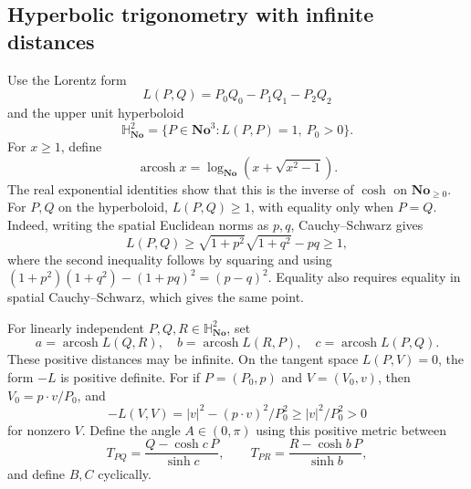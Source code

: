 \documentclass[11pt,letterpaper]{article}
\theoremstyle{definition}
\theoremstyle{remark}
\newcommand{\No}{\mathbf{No}}
\newcommand{\arcosh}{\operatorname{arcosh}}
\numberwithin{equation}{section}
\begin{document}
\subsection{Hyperbolic trigonometry with infinite distances}
Use the Lorentz form
\[
 L(P,Q)=P_0Q_0-P_1Q_1-P_2Q_2
\]
and the upper unit hyperboloid
\[
 \mathbb H^2_{\No}=\{P\in\No^3:L(P,P)=1,\ P_0>0\}.
\]
For $x\ge1$, define
\[
 \arcosh x=\log_{\No}(x+\sqrt{x^2-1}).
\]
The real exponential identities show that this is the inverse of $\cosh$ on $\No_{\ge0}$. For $P,Q$ on the hyperboloid, $L(P,Q)\ge1$, with equality only when $P=Q$. Indeed, writing the spatial Euclidean norms as $p,q$, Cauchy--Schwarz gives
\[
 L(P,Q)\ge\sqrt{1+p^2}\sqrt{1+q^2}-pq\ge1,
\]
where the second inequality follows by squaring and using
$(1+p^2)(1+q^2)-(1+pq)^2=(p-q)^2$. Equality also requires equality in spatial Cauchy--Schwarz, which gives the same point.

For linearly independent $P,Q,R\in\mathbb H^2_{\No}$, set
\[
 a=\arcosh L(Q,R),\quad b=\arcosh L(R,P),\quad c=\arcosh L(P,Q).
\]
These positive distances may be infinite. On the tangent space $L(P,V)=0$, the form $-L$ is positive definite. For if $P=(P_0,p)$ and $V=(V_0,v)$, then $V_0=p\cdot v/P_0$, and
\[
 -L(V,V)=|v|^2-(p\cdot v)^2/P_0^2\ge|v|^2/P_0^2>0
\]
for nonzero $V$. Define the angle $A\in(0,\pi)$ using this positive metric between
\[
 T_{PQ}=\frac{Q-\cosh c\,P}{\sinh c},\qquad
 T_{PR}=\frac{R-\cosh b\,P}{\sinh b},
\]
and define $B,C$ cyclically.
\end{document}
